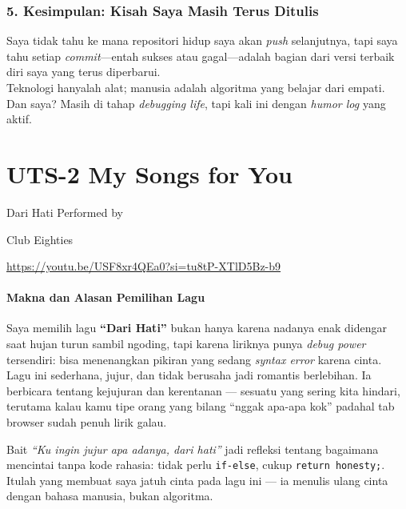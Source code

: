 \documentclass[
  letterpaper,
  DIV=11,
  numbers=noendperiod]{scrreprt}
\begin{document}
\subsection{\texorpdfstring{\textbf{5. Kesimpulan: Kisah Saya Masih
Terus
Ditulis}}{5. Kesimpulan: Kisah Saya Masih Terus Ditulis}}\label{kesimpulan-kisah-saya-masih-terus-ditulis}

Saya tidak tahu ke mana repositori hidup saya akan \emph{push}
selanjutnya, tapi saya tahu setiap \emph{commit}---entah sukses atau
gagal---adalah bagian dari versi terbaik diri saya yang terus
diperbarui.\\
Teknologi hanyalah alat; manusia adalah algoritma yang belajar dari
empati.\\
Dan saya? Masih di tahap \emph{debugging life}, tapi kali ini dengan
\emph{humor log} yang aktif.


\chapter{UTS-2 My Songs for You}\label{uts-2-my-songs-for-you}

Dari Hati Performed by

Club Eighties

\url{https://youtu.be/USF8xr4QEa0?si=tu8tP-XTlD5Bz-b9}

\subsubsection{Makna dan Alasan Pemilihan
Lagu}\label{makna-dan-alasan-pemilihan-lagu}

Saya memilih lagu \textbf{``Dari Hati''} bukan hanya karena nadanya enak
didengar saat hujan turun sambil ngoding, tapi karena liriknya punya
\emph{debug power} tersendiri: bisa menenangkan pikiran yang sedang
\emph{syntax error} karena cinta.\\
Lagu ini sederhana, jujur, dan tidak berusaha jadi romantis berlebihan.
Ia berbicara tentang kejujuran dan kerentanan --- sesuatu yang sering
kita hindari, terutama kalau kamu tipe orang yang bilang ``nggak apa-apa
kok'' padahal tab browser sudah penuh lirik galau.

Bait \emph{``Ku ingin jujur apa adanya, dari hati''} jadi refleksi
tentang bagaimana mencintai tanpa kode rahasia: tidak perlu
\texttt{if-else}, cukup \texttt{return\ honesty;}.\\
Itulah yang membuat saya jatuh cinta pada lagu ini --- ia menulis ulang
cinta dengan bahasa manusia, bukan algoritma.
\end{document}
